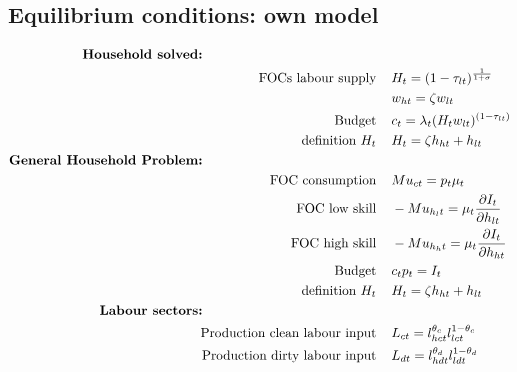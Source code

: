 \subsection{Equilibrium conditions: own model}

\begin{align*}
\text{\textbf{Household solved:}} \hspace{50mm}& \\
\text{FOCs labour supply}\hspace{4mm}&  %
H_t=(1-\tau_{lt})^\frac{1}{1+\sigma}\\
\ \hspace{4mm} & %
w_{ht}=\zeta w_{lt}\\
\text{Budget}\hspace{4mm}&  %
c_t= \lambda_t (H_tw_{lt})^{(1-\tau_{lt})}\\
\text{definition}\  H_t\hspace{4mm} & %
H_t=\zeta h_{ht}+h_{lt}
\\
\text{\textbf{General Household Problem:}} \hspace{50mm}& \\
\text{FOC consumption}\hspace{4mm}& Mu_{ct}=p_t\mu_t\\
\text{FOC low skill}\hspace{4mm} & -Mu_{h_lt}=\mu_t \frac{\partial I_t}{\partial h_{lt}}\\
\text{FOC high skill}\hspace{4mm} & -Mu_{h_ht}=\mu_t \frac{\partial I_t}{\partial h_{ht}}\\
\text{Budget}\hspace{4mm}& c_tp_t= I_t\\
\text{definition}\  H_t\hspace{4mm} & H_t=\zeta h_{ht}+h_{lt}\\
\text{\textbf{Labour sectors:}}\hspace{50mm}&\\
\text{Production clean labour input} \hspace{4mm}& L_{ct}=l_{hct}^{\theta_c}l_{lct}^{1-\theta_c}\\ 
\text{Production dirty labour input} \hspace{4mm}& L_{dt}=l_{hdt}^{\theta_d}l_{ldt}^{1-\theta_d}\\

\end{align*}
